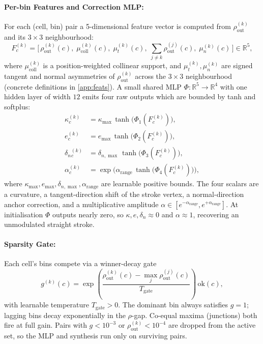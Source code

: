 \documentclass[11pt,a4paper]{article}
\newcommand{\R}{\mathbb{R}}
\begin{document}
\paragraph{Per-bin Features and Correction MLP:}
For each (cell, bin) pair a 5-dimensional feature vector is computed from $\rho_{\mathrm{out}}^{(k)}$ and its $3{\times}3$ neighbourhood:
\begin{equation}\label{eq:feats}
  F^{(k)}_c = \bigl[\, \rho_{\mathrm{out}}^{(k)}(c),\; \mu^{(k)}_{\mathrm{coll}}(c),\; \mu^{(k)}_{t}(c),\; \textstyle\sum_{j \neq k} \rho_{\mathrm{out}}^{(j)}(c),\; \mu^{(k)}_{n}(c)\,\bigr] \in \R^5,
\end{equation}
where $\mu^{(k)}_{\mathrm{coll}}$ is a position-weighted collinear support, and $\mu^{(k)}_{t}, \mu^{(k)}_{n}$ are signed tangent and normal asymmetries of $\rho_{\mathrm{out}}^{(k)}$ across the $3{\times}3$ neighbourhood (concrete definitions in \cref{app:feats}). A small shared MLP $\Phi : \R^5 \to \R^4$ with one hidden layer of width $12$ emits four raw outputs which are bounded by tanh and softplus:
\begin{equation}\label{eq:mlp-bounded}
  \begin{aligned}
    \kappa^{(k)}_c       &= \kappa_{\max}\, \tanh\!\bigl(\Phi_1(F^{(k)}_c)\bigr), \\
    e^{(k)}_c            &= e_{\max}\, \tanh\!\bigl(\Phi_2(F^{(k)}_c)\bigr), \\
    \delta_{n}{}^{(k)}_c &= \delta_{n,\max}\, \tanh\!\bigl(\Phi_3(F^{(k)}_c)\bigr), \\
    \alpha^{(k)}_c       &= \exp\!\bigl(\alpha_{\mathrm{range}}\, \tanh\!\bigl(\Phi_4(F^{(k)}_c)\bigr)\bigr),
  \end{aligned}
\end{equation}
where $\kappa_{\max}, e_{\max}, \delta_{n,\max}, \alpha_{\mathrm{range}}$ are learnable positive bounds. The four scalars are a curvature, a tangent-direction shift of the stroke vertex, a normal-direction anchor correction, and a multiplicative amplitude $\alpha \in [e^{-\alpha_{\mathrm{range}}}, e^{+\alpha_{\mathrm{range}}}]$. At initialisation $\Phi$ outputs nearly zero, so $\kappa, e, \delta_n \approx 0$ and $\alpha \approx 1$, recovering an unmodulated straight stroke.

\paragraph{Sparsity Gate:}
Each cell's bins compete via a winner-decay gate
\begin{equation}\label{eq:gate}
  g^{(k)}(c) = \exp\!\left(\frac{\rho_{\mathrm{out}}^{(k)}(c) - \max_j \rho_{\mathrm{out}}^{(j)}(c)}{T_{\mathrm{gate}}}\right)\, \mathrm{ok}(c),
\end{equation}
with learnable temperature $T_{\mathrm{gate}} > 0$. The dominant bin always satisfies $g = 1$; lagging bins decay exponentially in the $\rho$-gap. Co-equal maxima (junctions) both fire at full gain. Pairs with $g < 10^{-3}$ or $\rho_{\mathrm{out}}^{(k)} < 10^{-4}$ are dropped from the active set, so the MLP and synthesis run only on surviving pairs.
\end{document}
